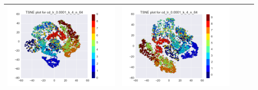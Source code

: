 \documentclass[12pt]{report}
\begin{document}
\begin{table}[H]
\begin{tabular}{ | c | c | c | c || c |}
\begin{minipage}{.3\textwidth}
      \includegraphics[scale=0.25]{cd_lr_0_0001_k_4_n_64.png}
    \end{minipage} &
    \begin{minipage}{.3\textwidth}
      \includegraphics[scale=0.25]{test_cd_lr_0_0001_k_4_n_64.png}
    \end{minipage}
        \\ \hline
  \end{tabular}
\end{table}
\end{document}
